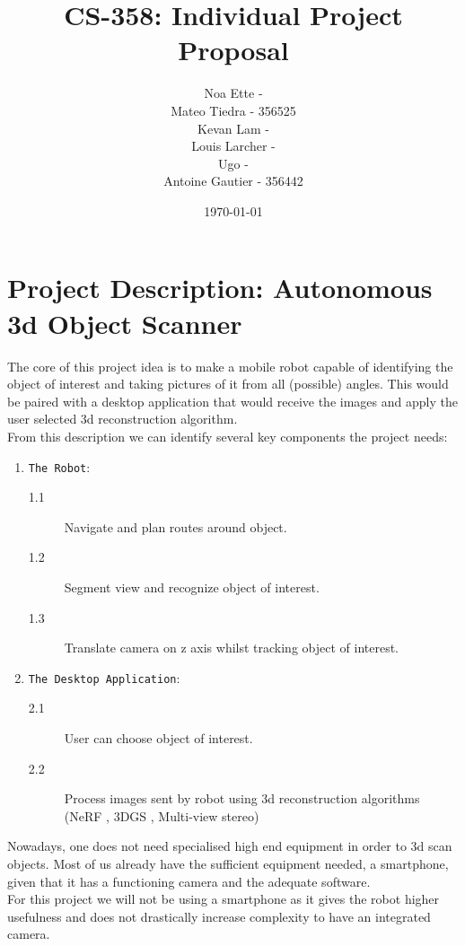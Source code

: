 \documentclass{article}
\title{CS-358: Individual Project Proposal}
\author{Noa Ette - \\Mateo Tiedra - 356525\\Kevan Lam - \\Louis Larcher - \\Ugo - \\Antoine Gautier - 356442}
\date{\today}
\begin{document}
\maketitle
\vspace{45mm}
\tableofcontents
\newpage
\section{Project Description: Autonomous 3d Object Scanner}

The core of this project idea is to make a mobile robot capable of identifying the object of interest and taking pictures of it from all (possible) angles. 
This would be paired with a desktop application that would receive the images and apply the user selected 3d reconstruction algorithm.\\


From this description we can identify several key components the project needs: \begin{enumerate}
    \item \texttt{The Robot}:
    \begin{description}
            \item[1.1] Navigate and plan routes around object.
            \item[1.2] Segment view and recognize object of interest.
            \item[1.3] Translate camera on z axis whilst tracking object of interest.
    \end{description}
    \item \texttt{The Desktop Application}:
    \begin{description}
        \item[2.1] User can choose object of interest.
        \item[2.2] Process images sent by robot using 3d reconstruction algorithms (NeRF \cite{mildenhall2020nerf}, 3DGS \cite{kerbl3Dgaussians}, Multi-view stereo)
    \end{description}
\end{enumerate}

Nowadays, one does not need specialised high end equipment in order to 3d scan objects. Most of us already have the sufficient equipment needed, a smartphone, given that it has a functioning camera and the adequate software. \\
For this project we will not be using a smartphone as it gives the robot higher usefulness and does not drastically increase complexity to have an integrated camera. 
\end{document}

